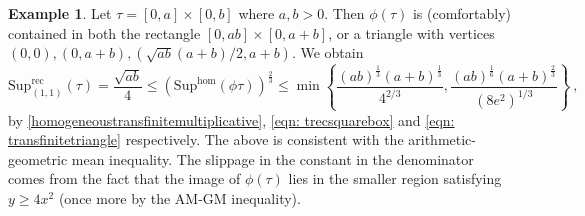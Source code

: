 \documentclass[a4paper,10pt]{amsart}
\newtheorem{cor}[thm]{Corollary}
\theoremstyle{definition}
\newtheorem{example}[thm]{Example}
\theoremstyle{remark}
\numberwithin{equation}{section}
\newcommand{\R}{\mathbb R}
\newcommand{\rec}{\mathrm{rec}}
\newcommand{\ts}{\mathrm{Sup}}
\newcommand{\0}{\color{blue}{\mathsf{0}}}
\begin{document}

  \begin{example}  Let  $\tau = [0,a]\times [0,b]$ where $a,b>0$. Then  $\phi(\tau)$ is (comfortably) contained in both the  rectangle  $[0,ab] \times [0,a+b]$, or a triangle with vertices $(0,0), (0, a+b), (\sqrt{ab}(a+b)/2,a+b)$. We obtain
  \[ \ts^{\rec}_{(1,1)}(\tau)  = \frac{\sqrt{ab}}{{4}} \leq  \left(\ts^{\mathrm{hom}}(\phi \tau) \right)^{\frac{2}{3}}\leq  \min \left\{  \frac{(ab)^{\frac{1}{3}} (a+b)^{\frac{1}{3}}}{4^{2/3}}  ,  \frac{(ab)^{\frac{1}{6}} (a+b)^{\frac{2}{3}}}{(8e^2)^{1/3}} \right\} \ , \] 
  by  \eqref{homogeneoustransfinitemultiplicative}, \eqref{eqn: trecsquarebox}  and \eqref{eqn: transfinitetriangle} respectively. The above is 
 consistent with the arithmetic-geometric mean inequality. The slippage in the constant in the denominator comes from the fact that the image of $\phi(\tau)$ lies in the smaller region satisfying $y\geq 4x^2$ (once more by the AM-GM inequality).
  \end{example}
  
\end{document}
